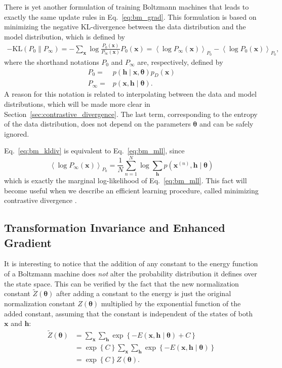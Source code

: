 \documentclass[dissertation,nocontribution]{aaltoseries}
\newcommand{\vect}[1]{\mathbf{#1}}
\newcommand{\vects}[1]{\boldsymbol{#1}}
\newcommand{\vh}[0]{\vect{h}}
\newcommand{\vx}[0]{\vect{x}}
\newcommand{\TT}[0]{{\vects{\theta}}}
\newcommand{\KL}[0]{\text{KL}}
\begin{document}
There is yet another formulation of training Boltzmann
machines that leads to exactly the same update rules in
Eq.~\eqref{eq:bm_grad}. This formulation is based on
minimizing the negative KL-divergence between the
data distribution and the model distribution, which is
defined by
\begin{align}
    \label{eq:bm_kldiv}
    -\KL(P_0 \| P_\infty) = -\sum_{\vx} \log
    \frac{P_0(\vx)}{P_\infty(\vx)} P_0(\vx) =
    \left<\log P_\infty(\vx) \right>_{P_0} - \left< \log P_0
    (\vx) \right>_{P_0},
\end{align}
where the shorthand notations $P_0$ and $P_\infty$ are,
respectively, 
defined by
\begin{align*}
    P_0 =& p\left(\vh \mid \vx, \TT\right)p_D\left(\vx\right)
    \\
    P_\infty =& p\left(\vx, \vh \mid \TT\right).
\end{align*}
A reason for this notation is related to interpolating
between the data and model distributions, which will be made
more clear in Section~\ref{sec:contrastive_divergence}. The
last term, corresponding to the entropy of the data
distribution, does not depend on the parameters $\TT$ and
can be safely ignored.

Eq.~\eqref{eq:bm_kldiv} is equivalent
to Eq.~\eqref{eq:bm_mll}, since
\[
\left< \log P_\infty(\vx) \right>_{P_0} = \frac{1}{N}
\sum_{n=1}^N \log \sum_{\vh} p(\vx^{(n)}, \vh \mid \TT)
\]
which is exactly the marginal log-likelihood of
Eq.~\eqref{eq:bm_mll}. This fact will become useful when we
describe an efficient learning procedure, called minimizing
contrastive divergence \citep{Hinton2002}.

\subsection{Transformation Invariance and Enhanced Gradient}
\label{sec:enhanced_grad}

It is interesting to notice that the addition of any constant
to the energy function of a Boltzmann machine does
\textit{not} alter the probability distribution it defines
over the state space. This can be 
verified by the
fact that the new normalization constant $\tilde{Z}(\TT)$
after adding a constant to the energy is just the original
normalization constant $Z(\TT)$ multiplied by the exponential
function of the added constant, assuming that the constant
is independent of the states of both $\vx$ and $\vh$:
\begin{align*}
    \tilde{Z}(\TT) &= \sum_\vx \sum_\vh \exp\left\{
    -E(\vx, \vh \mid \TT) + C \right\} \\
    &= \exp\left\{ C \right\} \sum_\vx \sum_\vh \exp\left\{
    -E(\vx, \vh \mid \TT) \right\} \\
    &= \exp\left\{ C \right\} Z(\TT).
\end{align*}
\end{document}
